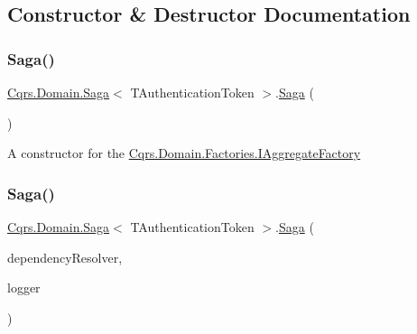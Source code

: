 \subsection{Constructor \& Destructor Documentation}
\mbox{\label{classCqrs_1_1Domain_1_1Saga_a1b6019cecbbf2572b64dd456cb5d91a2_a1b6019cecbbf2572b64dd456cb5d91a2}} 
\subsubsection{\texorpdfstring{Saga()}{Saga()}\hspace{0.1cm}{\footnotesize\ttfamily [1/3]}}
{\footnotesize\ttfamily \hyperlink{classCqrs_1_1Domain_1_1Saga}{Cqrs.\+Domain.\+Saga}$<$ T\+Authentication\+Token $>$.\hyperlink{classCqrs_1_1Domain_1_1Saga}{Saga} (\begin{DoxyParamCaption}{ }\end{DoxyParamCaption})\hspace{0.3cm}{\ttfamily [protected]}}



A constructor for the \hyperlink{interfaceCqrs_1_1Domain_1_1Factories_1_1IAggregateFactory}{Cqrs.\+Domain.\+Factories.\+I\+Aggregate\+Factory} 

\mbox{\label{classCqrs_1_1Domain_1_1Saga_affa39972d1946ab9f5d2474b17acbdd4_affa39972d1946ab9f5d2474b17acbdd4}} 
\subsubsection{\texorpdfstring{Saga()}{Saga()}\hspace{0.1cm}{\footnotesize\ttfamily [2/3]}}
{\footnotesize\ttfamily \hyperlink{classCqrs_1_1Domain_1_1Saga}{Cqrs.\+Domain.\+Saga}$<$ T\+Authentication\+Token $>$.\hyperlink{classCqrs_1_1Domain_1_1Saga}{Saga} (\begin{DoxyParamCaption}\item[{\hyperlink{interfaceCqrs_1_1Configuration_1_1IDependencyResolver}{I\+Dependency\+Resolver}}]{dependency\+Resolver,  }\item[{I\+Logger}]{logger }\end{DoxyParamCaption})\hspace{0.3cm}{\ttfamily [protected]}}



